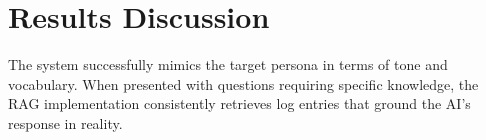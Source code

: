 \documentclass[12pt,a4paper]{report}
\begin{document}

\section{Results Discussion}
The system successfully mimics the target persona in terms of tone and vocabulary. When presented with questions requiring specific knowledge, the RAG implementation consistently retrieves log entries that ground the AI's response in reality.
\end{document}
